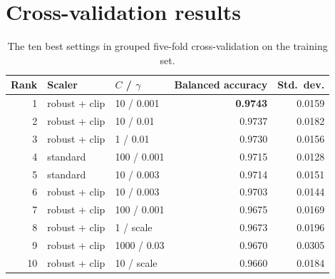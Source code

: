 \documentclass[11pt,a4paper]{article}
\begin{document}
\section{Cross-validation results}
\label{app:grid}
\begin{table}[htbp]
\centering
\caption{The ten best settings in grouped five-fold cross-validation on the training set.}
\label{tab:cvtop}
\begin{tabular}{rllrr}
\toprule
Rank & Scaler & $C$ / $\gamma$ & Balanced accuracy & Std.\ dev. \\
\midrule
1  & robust + clip & 10 / 0.001   & \textbf{0.9743} & 0.0159 \\
2  & robust + clip & 10 / 0.01    & 0.9737 & 0.0182 \\
3  & robust + clip & 1 / 0.01     & 0.9730 & 0.0156 \\
4  & standard      & 100 / 0.001  & 0.9715 & 0.0128 \\
5  & standard      & 10 / 0.003   & 0.9714 & 0.0151 \\
6  & robust + clip & 10 / 0.003   & 0.9703 & 0.0144 \\
7  & robust + clip & 100 / 0.001  & 0.9675 & 0.0169 \\
8  & robust + clip & 1 / scale    & 0.9673 & 0.0196 \\
9  & robust + clip & 1000 / 0.03  & 0.9670 & 0.0305 \\
10 & robust + clip & 10 / scale   & 0.9660 & 0.0184 \\
\bottomrule
\end{tabular}
\end{table}
\end{document}
